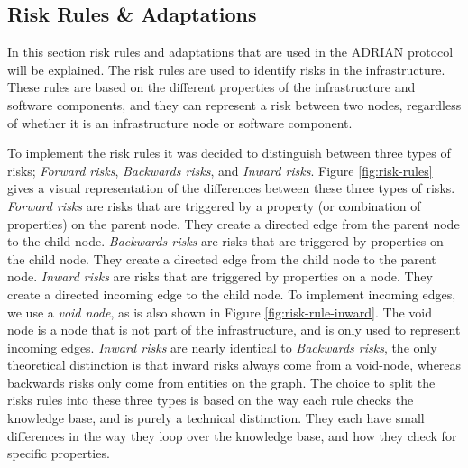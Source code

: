 

\subsection{Risk Rules \& Adaptations}
\label{ssec:risk-rules-adaptaions}
In this section risk rules and adaptations that are used in the ADRIAN protocol \cite{mann2023ADRIAN} will be explained. The risk rules are used to identify risks in the infrastructure. These rules are based on the different properties of the infrastructure and software components, and they can represent a risk between two nodes, regardless of whether it is an infrastructure node or software component.

To implement the risk rules it was decided to distinguish between three types of risks; \emph{Forward risks}, \emph{Backwards risks}, and \emph{Inward risks}. Figure \ref{fig:risk-rules} gives a visual representation of the differences between these three types of risks. 
\emph{Forward risks} are risks that are triggered by a property (or combination of properties) on the parent node. They create a directed edge from the parent node to the child node. 
\emph{Backwards risks} are risks that are triggered by properties on the child node. They create a directed edge from the child node to the parent node. 
\emph{Inward risks} are risks that are triggered by properties on a node. They create a directed incoming edge to the child node. To implement incoming edges, we use a \emph{void node}, as is also shown in Figure \ref{fig:risk-rule-inward}. The void node is a node that is not part of the infrastructure, and is only used to represent incoming edges.
\emph{Inward risks} are nearly identical to \emph{Backwards risks}, the only theoretical distinction is that inward risks always come from a void-node, whereas backwards risks only come from entities on the graph. 
The choice to split the risks rules into these three types is based on the way each rule checks the knowledge base, and is purely a technical distinction. They each have small differences in the way they loop over the knowledge base, and how they check for specific properties.


